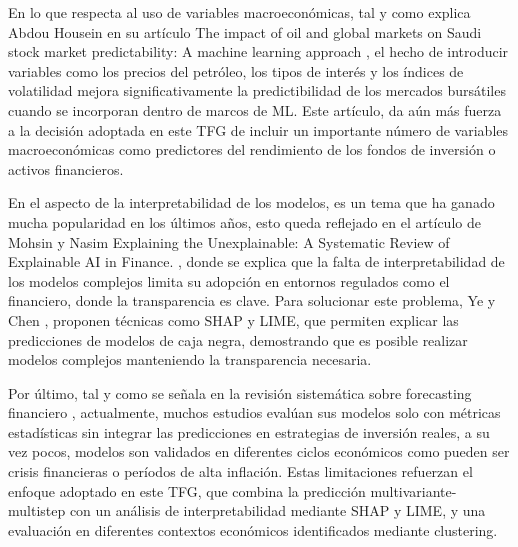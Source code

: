 En lo que respecta al uso de variables macroeconómicas, tal y como explica Abdou Housein en su artículo The impact of oil and global markets on Saudi stock market predictability: A machine learning approach \cite{abdou2024}, el hecho de introducir variables como los precios del petróleo, los tipos de interés y los índices de volatilidad mejora significativamente la predictibilidad de los mercados bursátiles cuando se incorporan dentro de marcos de ML. Este artículo, da aún más fuerza a la decisión adoptada en este TFG de incluir un importante número de variables macroeconómicas como predictores del rendimiento de los fondos de inversión o activos financieros.

En el aspecto de la interpretabilidad de los modelos, es un tema que ha ganado mucha popularidad en los últimos años, esto queda reflejado en el artículo de Mohsin y Nasim Explaining the Unexplainable: A Systematic Review of Explainable AI in Finance. \cite{mohsin2025}, donde se explica que la falta de interpretabilidad de los modelos complejos limita su adopción en entornos regulados como el financiero, donde la transparencia es clave. Para solucionar este problema, Ye y Chen \cite{ye2025}, proponen técnicas como SHAP y LIME, que permiten explicar las predicciones de modelos de caja negra, demostrando que es posible realizar modelos complejos manteniendo la transparencia necesaria.

Por último, tal y como se señala en la revisión sistemática sobre forecasting financiero \cite{vancsura2025}, actualmente, muchos estudios evalúan sus modelos solo con métricas estadísticas sin integrar las predicciones en estrategias de inversión reales, a su vez pocos, modelos son validados en diferentes ciclos económicos como pueden ser crisis financieras o períodos de alta inflación. Estas limitaciones refuerzan el enfoque adoptado en este TFG, que combina la predicción multivariante-multistep con un análisis de interpretabilidad mediante SHAP y LIME, y una evaluación en diferentes contextos económicos identificados mediante clustering.
